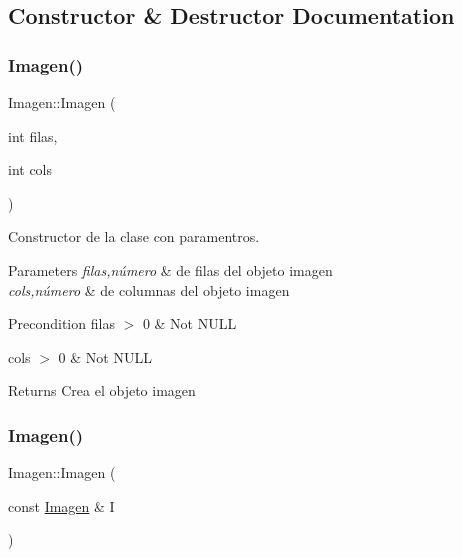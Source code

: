 \subsection{Constructor \& Destructor Documentation}
\mbox{\label{class_imagen_ad4943ff0e2de31d4c25a879030f3ebf2}} 
\subsubsection{\texorpdfstring{Imagen()}{Imagen()}\hspace{0.1cm}{\footnotesize\ttfamily [1/2]}}
{\footnotesize\ttfamily Imagen\+::\+Imagen (\begin{DoxyParamCaption}\item[{int}]{filas,  }\item[{int}]{cols }\end{DoxyParamCaption})}



Constructor de la clase con paramentros. 


\begin{DoxyParams}{Parameters}
{\em filas,número} & de filas del objeto imagen \\
\hline
{\em cols,número} & de columnas del objeto imagen \\
\hline
\end{DoxyParams}
\begin{DoxyPrecond}{Precondition}
filas $>$ 0 \& Not N\+U\+LL 

cols $>$ 0 \& Not N\+U\+LL 
\end{DoxyPrecond}
\begin{DoxyReturn}{Returns}
Crea el objeto imagen 
\end{DoxyReturn}
\mbox{\label{class_imagen_a5c25efc6e460f6de605942460db48057}} 
\subsubsection{\texorpdfstring{Imagen()}{Imagen()}\hspace{0.1cm}{\footnotesize\ttfamily [2/2]}}
{\footnotesize\ttfamily Imagen\+::\+Imagen (\begin{DoxyParamCaption}\item[{const \hyperlink{class_imagen}{Imagen} \&}]{I }\end{DoxyParamCaption})}



